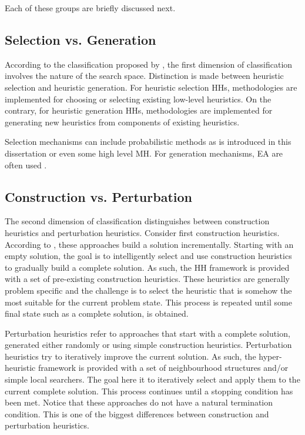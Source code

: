 Each of these groups are briefly discussed next.

\subsection{Selection vs. Generation}

According to the classification proposed by \cite{ref:burke:2010}, the first dimension of classification involves the nature of the search space. Distinction is made between heuristic selection and heuristic generation. For heuristic selection \acp{HH}, methodologies are implemented for choosing or selecting existing low-level heuristics. On the contrary, for heuristic generation \acp{HH}, methodologies  are implemented for generating new heuristics from components of existing heuristics.

Selection mechanisms can include probabilistic methods as is introduced in this dissertation or even some high level \ac{MH}. For generation mechanisms, \ac{EA} are often used \cite{ref:burke:2010}.

\subsection{Construction vs. Perturbation}

The second dimension of classification distinguishes between construction heuristics and perturbation heuristics. Consider first construction heuristics. According to \citeauthor{ref:burke:2010}\cite{ref:burke:2010}, these approaches build a solution incrementally. Starting with an empty solution, the goal is to intelligently select and use construction heuristics to gradually build a complete solution. As such, the \ac{HH} framework is provided with a set of pre-existing construction heuristics. These heuristics are generally problem specific and the challenge is to select the heuristic that is somehow the most suitable for the current problem state. This process is repeated until some final state such as a complete solution, is obtained.

Perturbation heuristics refer to approaches that start with a complete solution, generated either randomly or using simple construction heuristics.  Perturbation heuristics try to iteratively improve the current solution. As such, the hyper-heuristic framework is provided with a set of neighbourhood structures and/or simple local searchers. The goal here it to iteratively select and apply them to the current complete solution. This process continues until a stopping condition has been met. Notice that these approaches do not have a natural termination condition.
This is one of the biggest differences between construction and perturbation heuristics. 

